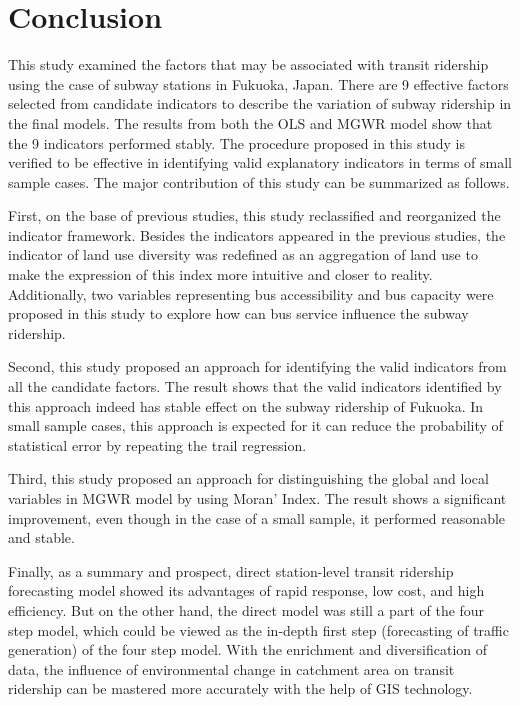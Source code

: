 \section{Conclusion}
%
This study examined the factors that may be associated with transit ridership using the case of subway stations in Fukuoka, Japan. There are 9 effective factors selected from candidate indicators to describe the variation of subway ridership in the final models. The results from both the OLS and MGWR model show that the 9 indicators performed stably. The procedure proposed in this study is verified to be effective in identifying valid explanatory indicators in terms of small sample cases. The major contribution of this study can be summarized as follows.

%
First, on the base of previous studies, this study reclassified and reorganized the indicator framework. Besides the indicators appeared in the previous studies, the indicator of land use diversity was redefined as an aggregation of land use to make the expression of this index more intuitive and closer to reality. Additionally, two variables representing bus accessibility and bus capacity were proposed in this study to explore how can bus service influence the subway ridership.

%
Second, this study proposed an approach for identifying the valid indicators from all the candidate factors. The result shows that the valid indicators identified by this approach indeed has stable effect on the subway ridership of Fukuoka. In small sample cases, this approach is expected for it can reduce the probability of statistical error by repeating the trail regression.

%
Third, this study proposed an approach for distinguishing the global and local variables in MGWR model by using Moran’ Index. The result shows a significant improvement, even though in the case of a small sample, it performed reasonable and stable.

%
Finally, as a summary and prospect, direct station-level transit ridership forecasting model showed its advantages of rapid response, low cost, and high efficiency. But on the other hand, the direct model was still a part of the four step model, which could be viewed as the in-depth first step (forecasting of traffic generation) of the four step model. With the enrichment and diversification of data, the influence of environmental change in catchment area on transit ridership can be mastered more accurately with the help of GIS technology.

\clearpage %
% 

